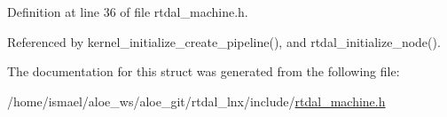 Definition at line 36 of file rtdal\-\_\-machine.\-h.



Referenced by kernel\-\_\-initialize\-\_\-create\-\_\-pipeline(), and rtdal\-\_\-initialize\-\_\-node().



The documentation for this struct was generated from the following file\-:\begin{DoxyCompactItemize}
\item 
/home/ismael/aloe\-\_\-ws/aloe\-\_\-git/rtdal\-\_\-lnx/include/\hyperlink{rtdal__machine_8h}{rtdal\-\_\-machine.\-h}\end{DoxyCompactItemize}
